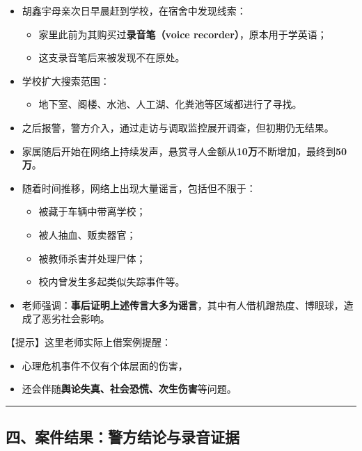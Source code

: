 \documentclass[
  chinese,
  9pt,
  a4paper,
]{ctexart}
\providecommand{\tightlist}{%
  \setlength{\itemsep}{0pt}\setlength{\parskip}{0pt}}
\begin{document}
\begin{itemize}
\item
  胡鑫宇母亲次日早晨赶到学校，在宿舍中发现线索：

  \begin{itemize}
  \tightlist
  \item
    家里此前为其购买过\textbf{录音笔（voice
    recorder）}，原本用于学英语；
  \item
    这支录音笔后来被发现不在原处。
  \end{itemize}
\item
  学校扩大搜索范围：

  \begin{itemize}
  \tightlist
  \item
    地下室、阁楼、水池、人工湖、化粪池等区域都进行了寻找。
  \end{itemize}
\item
  之后报警，警方介入，通过走访与调取监控展开调查，但初期仍无结果。
\item
  家属随后开始在网络上持续发声，悬赏寻人金额从\textbf{10万}不断增加，最终到\textbf{50万}。
\item
  随着时间推移，网络上出现大量谣言，包括但不限于：

  \begin{itemize}
  \tightlist
  \item
    被藏于车辆中带离学校；
  \item
    被人抽血、贩卖器官；
  \item
    被教师杀害并处理尸体；
  \item
    校内曾发生多起类似失踪事件等。
  \end{itemize}
\item
  老师强调：\textbf{事后证明上述传言大多为谣言}，其中有人借机蹭热度、博眼球，造成了恶劣社会影响。
\end{itemize}

【提示】这里老师实际上借案例提醒：

\begin{itemize}
\tightlist
\item
  心理危机事件不仅有个体层面的伤害，
\item
  还会伴随\textbf{舆论失真、社会恐慌、次生伤害}等问题。
\end{itemize}

\begin{center}\rule{0.5\linewidth}{0.5pt}\end{center}

\subsection{四、案件结果：警方结论与录音证据}\label{ux56dbux6848ux4ef6ux7ed3ux679cux8b66ux65b9ux7ed3ux8bbaux4e0eux5f55ux97f3ux8bc1ux636e}
\end{document}
